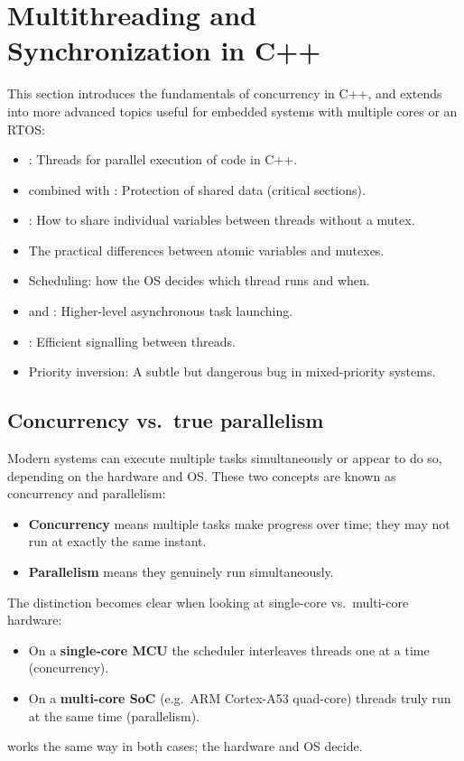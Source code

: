 
\section{Multithreading and Synchronization in C++}
\label{c6:sec:threads}\label{c6:app:a}
This section introduces the fundamentals of concurrency in C++, and extends into more advanced
topics useful for embedded systems with multiple cores or an RTOS:
\begin{itemize}
  \item {}: Threads for parallel execution of code in C++.
  \item {} combined with : Protection of shared data (critical
    sections).
  \item {}: How to share individual variables between threads without a mutex.
  \item The practical differences between atomic variables and mutexes.
  \item Scheduling: how the OS decides which thread runs and when.
  \item {} and : Higher-level asynchronous task launching.
  \item {}: Efficient signalling between threads.
  \item Priority inversion: A subtle but dangerous bug in mixed-priority systems.
\end{itemize}

\subsection{Concurrency vs.\ true parallelism}
\label{c6:sec:parallelism}
Modern systems can execute multiple tasks simultaneously or appear to do so, depending on the
hardware and OS. These two concepts are known as concurrency and parallelism:
\begin{itemize}
  \item \textbf{Concurrency} means multiple tasks make progress over time; they may not run at
    exactly the same instant.
  \item \textbf{Parallelism} means they genuinely run simultaneously.
\end{itemize}
The distinction becomes clear when looking at single-core vs.\ multi-core hardware:
\begin{itemize}
  \item On a \textbf{single-core MCU} the scheduler interleaves threads one at a time
    (concurrency).
  \item On a \textbf{multi-core SoC} (e.g.\ ARM Cortex-A53 quad-core) threads truly run at the same
    time (parallelism).
\end{itemize}
 works the same way in both cases; the hardware and OS decide.

